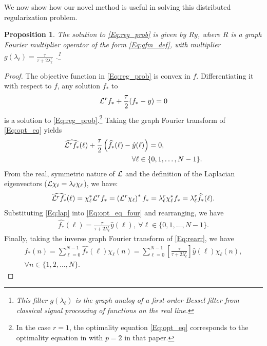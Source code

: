 \documentclass[conference]{IEEEtran}
\newtheorem{proposition}{\textbf{Proposition}}
\renewcommand{\l}{\ell}
\renewcommand{\L}{{\mathcal{L}}}
\def\L{{\cal L}}
\begin{document}
We now show how our novel method is useful in solving this distributed regularization problem.
\begin{proposition} \label{Prop:reg}
The solution to \eqref{Eq:reg_prob} is given by $Ry$, where $R$ is a graph Fourier multiplier operator of the form \eqref{Eq:gfm_def}, with multiplier $g(\lambda_{\l})=\frac{\tau}{\tau+2\lambda_{\l}^r}$ .\footnote{This filter $g(\lambda_{\l})$ is the graph analog of a first-order Bessel filter from classical signal processing of functions on the real line.}
\end{proposition}
\begin{proof}
The objective function in \eqref{Eq:reg_prob} is convex in $f$. Differentiating it with respect to $f$, any solution $f_*$ to
\begin{eqnarray}\label{Eq:opt_eq}
\L^r f_* + \frac{\tau}{2}(f_*-y)=0
\end{eqnarray}
is a solution to \eqref{Eq:reg_prob}.\footnote{In the case $r=1$, the optimality equation \eqref{Eq:opt_eq} corresponds to the optimality equation in \cite[Section III-A]{elmoataz} with $p=2$ in that paper.} Taking the graph Fourier transform of \eqref{Eq:opt_eq} yields
\begin{eqnarray}\label{Eq:opt_eq_four}
&\widehat{\L^r f_*}(\l) + \frac{\tau}{2}\left(\widehat{f_*}(\l)-\hat{y}(\l)\right)=0, \\
&\hspace{1.3in}\forall \l \in \{0,1,\ldots,N-1\}. \nonumber
\end{eqnarray}
From the real, symmetric nature of $\L$ and the definition of the Laplacian eigenvectors ($\L \chi_{\l} = \lambda_{\l} \chi_{\l}$), we have:
\begin{eqnarray} \label{Eq:lap}
\widehat{\L^r f_*}(\l) = \chi_{\l}^* \L^r f_* = \left(\L^r \chi_{\l}\right)^*f_* = \lambda_{\l}^r\chi_{\l}^* f_* = \lambda_{\l}^r \widehat{f_*}(\l).
\end{eqnarray}
Substituting \eqref{Eq:lap} into \eqref{Eq:opt_eq_four} and rearranging, we have
\begin{eqnarray} \label{Eq:rearr}
\widehat{f_*}(\l)=\frac{\tau}{\tau+2\lambda_{\l}^r}\hat{y}(\l),~\forall \l \in \{0,1,\ldots,N-1\}.
\end{eqnarray}
Finally, taking the inverse graph Fourier transform of \eqref{Eq:rearr}, we have
\begin{eqnarray}\label{Eq:reg_multiplier}
f_*(n)=\sum_{\l=0}^{N-1}\widehat{f_*}(\l)\chi_{\l}(n)=\sum_{\l=0}^{N-1}\left[\frac{\tau}{\tau+2\lambda_{\l}^r}\right]\hat{y}(\l)\chi_{\l}(n),
\\
\forall n \in \{1,2,\ldots,N\}. \nonumber
\end{eqnarray}
\end{proof}
\end{document}
